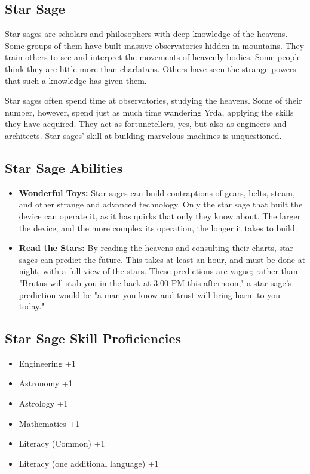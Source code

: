 \begin{multicols}{2}
\section{Star Sage}

Star sages are scholars and philosophers with deep knowledge of the heavens.
Some groups of them have built massive observatories hidden in mountains. They
train others to see and interpret the movements of heavenly bodies. Some people
think they are little more than charlatans. Others have seen the strange powers
that such a knowledge has given them.

Star sages often spend time at observatories, studying the heavens. Some of their
number, however, spend just as much time wandering Yrda, applying the skills they
have acquired. They act as fortunetellers, yes, but also as engineers and architects.
Star sages' skill at building marvelous machines is unquestioned.

\subsection{Star Sage Abilities}

\begin{itemize}
    \item \textbf{Wonderful Toys:} Star sages can build contraptions of gears, belts,
    steam, and other strange and advanced technology. Only the star sage that built
    the device can operate it, as it has quirks that only they know about. The larger
    the device, and the more complex its operation, the longer it takes to build.
    \item \textbf{Read the Stars:} By reading the heavens and consulting their charts,
    star sages can predict the future. This takes at least an hour, and must be done
    at night, with a full view of the stars. These predictions are vague; rather than
    "Brutus will stab you in the back at 3:00 PM this afternoon," a star sage's prediction
    would be "a man you know and trust will bring harm to you today."
\end{itemize}

\subsection{Star Sage Skill Proficiencies}

\begin{itemize}
    \item Engineering +1
    \item Astronomy +1
    \item Astrology +1
    \item Mathematics +1
    \item Literacy (Common) +1
    \item Literacy (one additional language) +1
\end{itemize}


\end{multicols}
